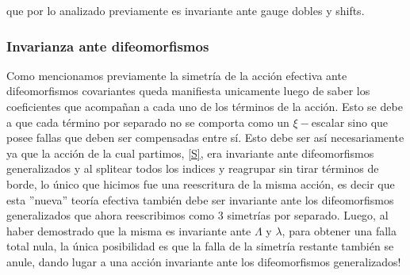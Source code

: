 \documentclass{article}
\numberwithin{equation}{section}
\begin{document}
\vspace{.5cm}

que por lo analizado previamente es invariante ante gauge dobles y shifts.

\subsubsection{Invarianza ante difeomorfismos}\label{sec_difeoinvariance}

Como mencionamos previamente la simetría de la acción efectiva ante difeomorfismos covariantes queda manifiesta unicamente luego de saber los coeficientes que acompañan a cada uno de los términos de la acción. Esto se debe a que cada término por separado no se comporta como un $ \xi-$escalar sino que posee fallas que deben ser compensadas entre sí. Esto debe ser así necesariamente ya que la acción de la cual partimos, \ref{S}, era invariante ante difeomorfismos generalizados y al splitear todos los indices y reagrupar sin tirar términos de borde, lo único que hicimos fue una reescritura de la misma acción, es decir que esta ''nueva'' teoría efectiva también debe ser invariante ante los difeomorfismos generalizados que ahora reescribimos como 3 simetrías por separado. Luego, al haber demostrado que la misma es invariante ante $ \Lambda $ y $ \lambda $, para obtener una falla total nula, la única posibilidad es que la falla de la simetría restante también se anule, dando lugar a una acción invariante ante los difeomorfismos generalizados!

\vspace{.8cm}
\end{document}
